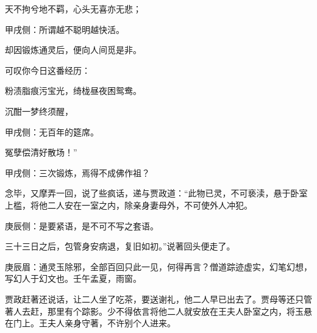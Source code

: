 \begin{poem}
    \begin{pl}   天不拘兮地不羁，心头无喜亦无悲；\end{pl}
    \begin{note}甲戌侧：所谓越不聪明越快活。\end{note}

    \begin{pl}   却因锻炼通灵后，便向人间觅是非。\end{pl}
\end{poem}


\begin{parag}
    可叹你今日这番经历：
\end{parag}


\begin{poem}
    \begin{pl} 粉渍脂痕污宝光，绮栊昼夜困鸳鸯。\end{pl}

    \begin{pl} 沉酣一梦终须醒，\end{pl}\begin{note}甲戌侧：无百年的筵席。\end{note}\begin{pl}冤孽偿清好散场！”\end{pl}\begin{note}甲戌侧：三次锻炼，焉得不成佛作祖？\end{note}
\end{poem}


\begin{parag}
    念毕，又摩弄一回，说了些疯话，递与贾政道：“此物已灵，不可亵渎，悬于卧室上槛，将他二人安在一室之内，除亲身妻母外，不可使外人冲犯。\begin{note}庚辰侧：是要紧语，是不可不写之套语。\end{note}三十三日之后，包管身安病退，复旧如初。”说著回头便走了。\begin{note}庚辰眉：通灵玉除邪，全部百回只此一见，何得再言？僧道踪迹虚实，幻笔幻想，写幻人于幻文也。壬午孟夏，雨窗。\end{note}贾政赶著还说话，让二人坐了吃茶，要送谢礼，他二人早已出去了。贾母等还只管著人去赶，那里有个踪影。少不得依言将他二人就安放在王夫人卧室之内，将玉悬在门上。王夫人亲身守著，不许别个人进来。
\end{parag}


